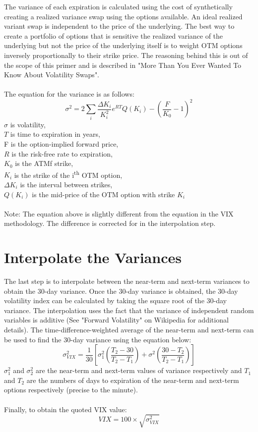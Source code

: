 \documentclass[11pt, oneside]{book}
\begin{document}
The variance of each expiration is calculated using the cost of synthetically creating a realized variance swap using the options available. An ideal realized variant swap is independent to the price of the underlying. The best way to create a portfolio of options that is sensitive the realized variance of the underlying but not the price of the underlying itself is to weight OTM options inversely proportionally to their strike price. The reasoning behind this is out of the scope of this primer and is described in "More Than You Ever Wanted To Know About Volatility Swaps".\\
\\
The equation for the variance is as follows:
\begin{equation}
\sigma^2 = 2\sum_i{\frac{\Delta K_i}{K_i^2}e^{RT}Q(K_i)}-(\frac{F}{K_0}-1)^2
\end{equation} \label{Eq-VarianceCalc}
$\sigma$ is volatility,\\
$T$ is time to expiration in years,\\
F is the option-implied forward price,\\
$R$ is the risk-free rate to expiration,\\$K_0$ is the ATMf strike,\\
$K_i$ is the strike of the i\textsuperscript{th} OTM option,\\
$\Delta K_i$ is the interval between strikes,\\
$Q(K_i)$ is the mid-price of the OTM option with strike $K_i$\\\\
Note: The equation above is slightly different from the equation in the VIX methodology. The difference is corrected for in the interpolation step.

\section{Interpolate the Variances}\label{CalcVix-InterpVariance}
The last step is to interpolate between the near-term and next-term variances to obtain the 30-day variance. Once the 30-day variance is obtained, the 30-day volatility index can be calculated by taking the square root of the 30-day variance. The interpolation uses the fact that the variance of independent random variables is additive (See "Forward Volatility" on Wikipedia for additional details). The time-difference-weighted average of the near-term and next-term can be used to find the 30-day variance using the equation below:
\begin{equation}
\sigma_{VIX}^2=\frac{1}{30}[\sigma_1^2(\frac{T_2-30}{T_2-T_1})+\sigma^2(\frac{30-T_2}{T_2-T_1})] \label{Eq-VolInterpolate}
\end{equation}
$\sigma_1^2$ and $\sigma_2^2$ are the near-term and next-term values of variance respectively and $T_1$ and $T_2$ are the numbers of days to expiration of the near-term and next-term options respectively (precise to the minute). \\
\\
Finally, to obtain the quoted VIX value:
\begin{equation}
VIX = 100 \times \sqrt{\sigma_{VIX}^2}
\end{equation} \label{Eq-FinalVIX}
\end{document}
